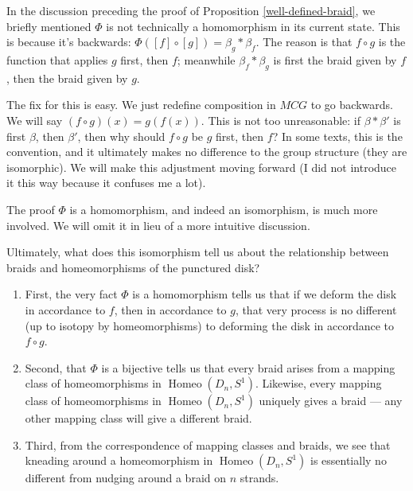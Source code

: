 \documentclass{amsart}
\DeclareMathOperator{\Homeo}{Homeo}
\newtheorem*{comment}{Author comment}
\begin{document}
In the discussion preceding the proof of Proposition \ref{well-defined-braid},
we briefly mentioned \(\Phi\) is not technically a homomorphism in its current
state. This is because it's backwards: \(\Phi([f]\circ[g]) =
\beta_g\ast\beta_f\). The reason is that \(f\circ g\) is the function that
applies \(g\) first, then \(f\); meanwhile \(\beta_f\ast\beta_g\) is first the
braid given by \(f\), then the braid given by \(g\).

The fix for this is easy. We just redefine composition in \(MCG\) to go
backwards. We will say \((f\circ g)(x) = g(f(x))\). This is not too
unreasonable: if \(\beta\ast\beta'\) is first \(\beta\), then \(\beta'\), then
why should \(f\circ g\) be \(g\) first, then \(f\)? In some texts, this is
the convention, and it ultimately makes no difference to the group structure
(they are isomorphic). We will make this adjustment moving forward (I did not
introduce it this way because it confuses me a lot).

The proof \(\Phi\) is a homomorphism, and indeed an isomorphism, is much more
involved. We will omit it in lieu of a more intuitive discussion.

Ultimately, what does this isomorphism tell us about the relationship between
braids and homeomorphisms of the punctured disk? 

\begin{enumerate}[label=(\roman*)]
	\item First, the very fact \(\Phi\) is a homomorphism tells us that if we
	deform the disk in accordance to \(f\), then in accordance to \(g\), that
	very process is no different (up to isotopy by homeomorphisms) to deforming
	the disk in accordance to \(f\circ g\).

	\item Second, that \(\Phi\) is a bijective tells us that every braid arises
	from a mapping class of homeomorphisms in \(\Homeo(D_n, S^1)\). Likewise,
	every mapping class of homeomorphisms in \(\Homeo(D_n, S^1)\) uniquely gives
	a braid --- any other mapping class will give a different braid.

	\item Third, from the correspondence of mapping classes and braids, we see
	that kneading around a
	homeomorphism in \(\Homeo(D_n, S^1)\) is essentially no different from
	nudging around a braid on \(n\) strands.
\end{enumerate}
\end{document}
